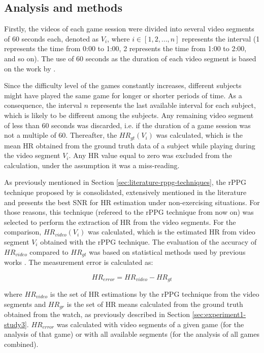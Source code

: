 \subsection{Analysis and methods}

Firstly, the videos of each game session were divided into several video segments of 60 seconds each, denoted as $V_i$, where $i \in [1, 2, ..., n]$ represents the interval (1 represents the time from 0:00 to 1:00, 2 represents the time from 1:00 to 2:00, and so on). The use of 60 seconds as the duration of each video segment is based on the work by \textcite{poh2011advancements}.

Since the difficulty level of the games constantly increases, different subjects might have played the same game for longer or shorter periods of time. As a consequence, the interval $n$ represents the last available interval for each subject, which is likely to be different among the subjects. Any remaining video segment of less than 60 seconds was discarded, i.e. if the duration of a game session was not a multiple of 60. Thereafter, the $HR_{gt}(V_i)$ was calculated, which is the mean HR obtained from the ground truth data of a subject while playing during the video segment $V_i$. Any HR value equal to zero was excluded from the calculation, under the assumption it was a miss-reading.

As previously mentioned in Section \ref{sec:literature-rppg-techniques}, the rPPG technique proposed by \textcite{poh2011advancements} is consolidated, extensively mentioned in the literature and presents the best SNR for HR estimation under non-exercising situations. For those reasons, this technique (refereed to the rPPG technique from now on) was selected to perform the extraction of HR from the video segments. For the comparison, $HR_{video}(V_i)$ was calculated, which is the estimated HR from video segment $V_i$ obtained with the rPPG technique. The evaluation of the accuracy of $HR_{video}$ compared to $HR_{gt}$ was based on statistical methods used by previous works \parencite{poh2011advancements, rouast2016remote, li2014remote}. The measurement error is calculated as:

\begin{equation}
\label{eqn:hr-error}
HR_{error} = HR_{video} - HR_{gt}
\end{equation}

where $HR_{video}$ is the set of HR estimations by the rPPG technique from the video segments and $HR_{gr}$ is the set of HR means calculated from the ground truth obtained from the watch, as previously described in Section \ref{sec:experiment1-study3}. $HR_{error}$ was calculated with video segments of a given game (for the analysis of that game) or with all available segments (for the analysis of all games combined).

